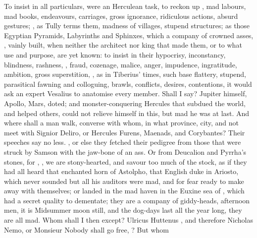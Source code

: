 To insist in all particulars, were an Herculean task, to
reckon up , mad labours, mad books, endeavours, carriages,
gross ignorance, ridiculous actions, absurd gestures; , as Tully terms them, madness of villages,
stupend structures; as those Egyptian Pyramids, Labyrinths and Sphinxes, which
a company of crowned asses, , vainly built, when
neither the architect nor king that made them, or to what use and purpose, are
yet known: to insist in their hypocrisy, inconstancy, blindness, rashness,
, fraud, cozenage, malice, anger, impudence,
ingratitude, ambition, gross superstition, , as in Tiberius' times, such base flattery,
stupend, parasitical fawning and colloguing, \etc{} brawls, conflicts, desires,
contentions, it would ask an expert Vesalius to anatomise every member. Shall I
say? Jupiter himself, Apollo, Mars, \etc{} doted; and monster-conquering
Hercules that subdued the world, and helped others, could not relieve himself
in this, but mad he was at last. And where shall a man walk, converse with
whom, in what province, city, and not meet with Signior Deliro, or Hercules
Furens, Maenads, and Corybantes? Their speeches say no less.
, or else they fetched their
pedigree from those that were struck by Samson with the jaw-bone of an ass. Or
from Deucalion and Pyrrha's stones, for ,
, we are stony-hearted, and savour too
much of the stock, as if they had all heard that enchanted horn of Astolpho,
that English duke in Ariosto, which never sounded but all his auditors were
mad, and for fear ready to make away with themselves; or
landed in the mad haven in the Euxine sea of , which had a
secret quality to dementate; they are a company of giddy-heads, afternoon men,
it is Midsummer moon still, and the dog-days last all the year long, they are
all mad. Whom shall I then except? Ulricus Huttenus
, \etc{} and therefore Nicholas Nemo, or Monsieur
Nobody shall go free, ? But whom
